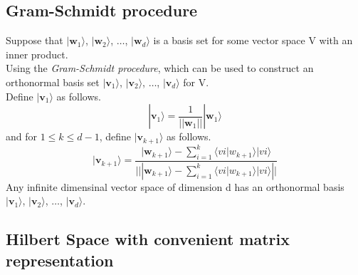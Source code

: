\documentclass{article}
\begin{document}
\subsection{Gram-Schmidt procedure}
Suppose that $|\mathbf{w}_1\rangle$, $|\mathbf{w}_2\rangle$, $\ldots$, $|\mathbf{w}_d\rangle$ is a basis set for some vector space V with an inner product. \\
Using the \textit{Gram-Schmidt procedure}, which can be used to construct an orthonormal basis set $|\mathbf{v}_1\rangle$, $|\mathbf{v}_2\rangle$, $\ldots$, $|\mathbf{v}_d\rangle$ for V. \\
Define $|\mathbf{v}_1\rangle$ as follows. \\
\begin{equation}
    |\mathbf{v}_1\rangle = \frac{1}{||\mathbf{w}_1||} |\mathbf{w}_1\rangle
\end{equation}
and for $1 \leq k \leq d - 1 $, define $|\mathbf{v}_{k+1}\rangle$ as follows. \\
\begin{equation}
    |\mathbf{v}_{k+1} \rangle =
    \frac{|\mathbf{w}_{k+1}\rangle - \sum_{i=1}^k \langle vi \vert w_{k+1} \rangle \vert vi \rangle}
    {|||\mathbf{w}_{k+1}\rangle - \sum_{i=1}^k \langle vi \vert w_{k+1} \rangle \vert vi \rangle||}
\end{equation}
Any infinite dimensinal vector space of dimension d has an orthonormal basis
$|\mathbf{v}_1\rangle$, $|\mathbf{v}_2\rangle$, $\ldots$, $|\mathbf{v}_d\rangle$. \\
\subsection{Hilbert Space with convenient matrix representation}
\end{document}
